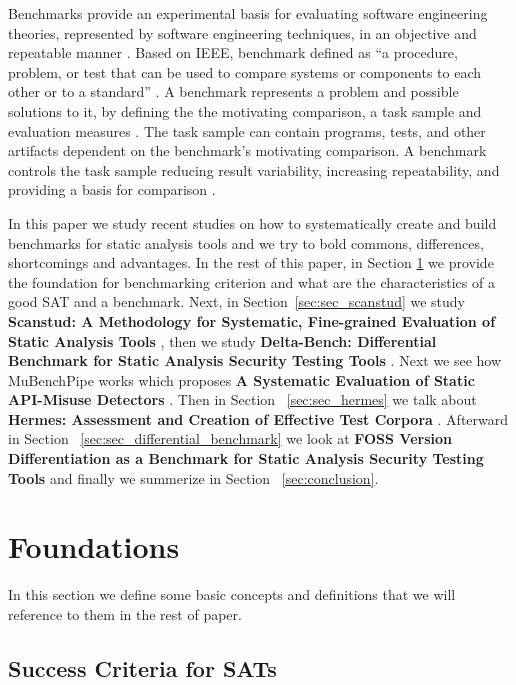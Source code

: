 \documentclass[authoryear,preprint]{sigplanconf}
\begin{document}
Benchmarks provide an experimental basis for evaluating software engineering theories, represented by software engineering techniques, in an objective and repeatable manner \cite{675631}. Based on IEEE, benchmark defined as “a procedure, problem, or test that can be used to compare systems or components to each other or to a standard” \cite{IEEE1990}. A benchmark represents a problem and possible solutions to it, by defining the the motivating comparison, a task sample and evaluation measures \cite{sim2003}.  The task sample can contain programs, tests, and other artifacts dependent on the benchmark’s motivating comparison. A benchmark controls the task sample reducing result variability, increasing repeatability, and providing a basis for comparison \cite{sim2003}.

In this paper we study recent studies on how to systematically create and build benchmarks for static analysis tools and we try to bold commons, differences, shortcomings and advantages. In the rest of this paper, in Section \ref{sec:sec_approaches} we provide the foundation for benchmarking criterion and what are the characteristics of a good SAT and a benchmark. Next, in Section~\ref{sec:sec_scanstud} we study \textbf{Scanstud: A Methodology for Systematic, Fine-grained Evaluation of Static Analysis Tools} \cite{Scanstud}, then we study \textbf{Delta-Bench: Differential Benchmark for Static Analysis Security Testing Tools} \cite{8170097}. Next we see how MuBenchPipe works which proposes \textbf{A Systematic Evaluation of Static API-Misuse Detectors} \cite{8338426}. Then in Section ~\ref{sec:sec_hermes} we talk about \textbf{Hermes: Assessment and Creation of Effective Test Corpora} \cite{Reif:2017:HAC:3088515.3088523}. Afterward in Section ~\ref{sec:sec_differential_benchmark} we look at \textbf{FOSS Version Differentiation as a Benchmark for Static Analysis Security Testing Tools} \cite{Pashchenko:2017:FVD:3106237.3121276} and finally we summerize in Section ~\ref{sec:conclusion}. 

\section{Foundations}
\label{sec:sec_approaches}

In this section we define some basic concepts and definitions that we will reference to them in the rest of paper. 

\subsection{Success Criteria for SATs}
\label{sec:subsec_successc}
\end{document}
